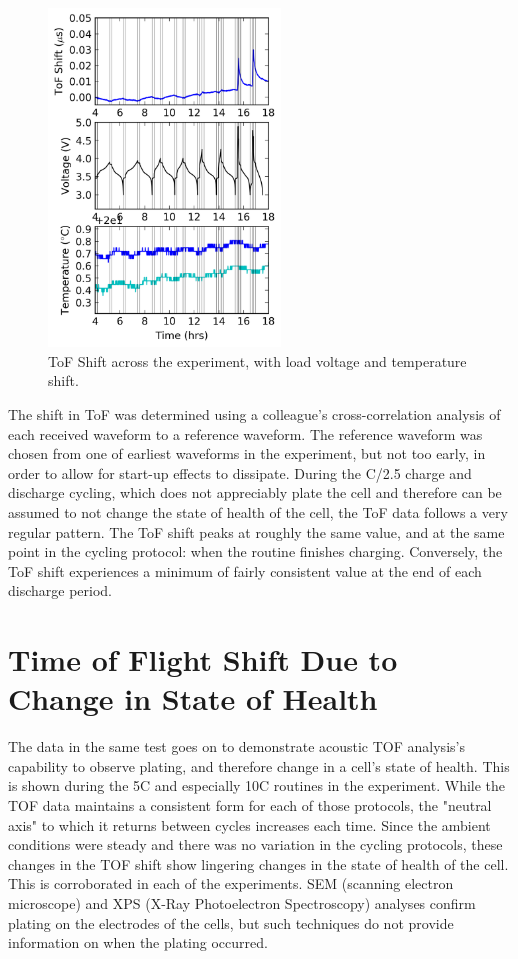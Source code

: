 \begin{figure}[t]\label{fig:0315}
    \includegraphics[width=0.55\textwidth]{Thesis/0315.png}
    \centering
    \caption{ToF Shift across the experiment, with load voltage and temperature shift.}
\end{figure}

The shift in ToF was determined using a colleague's cross-correlation analysis of each received waveform to a reference waveform. The reference waveform was chosen from one of earliest waveforms in the experiment, but not too early, in order to allow for start-up effects to dissipate.
During the C/2.5 charge and discharge cycling, which does not appreciably plate the cell and therefore can be assumed to not change the state of health of the cell, the ToF data follows a very regular pattern. 
The ToF shift peaks at roughly the same value, and at the same point in the cycling protocol: when the routine finishes charging. 
Conversely, the ToF shift experiences a minimum of fairly consistent value at the end of each discharge period.

\section{Time of Flight Shift Due to Change in State of Health}
The data in the same test goes on to demonstrate acoustic TOF analysis's capability to observe plating, and therefore change in a cell's state of health. This is shown during the 5C and especially 10C routines in the experiment. 
While the TOF data maintains a consistent form for each of those protocols, the "neutral axis" to which it returns between cycles increases each time. 
Since the ambient conditions were steady and there was no variation in the cycling protocols, these changes in the TOF shift show lingering changes in the state of health of the cell. 
This is corroborated in each of the experiments. 
SEM (scanning electron microscope) and XPS (X-Ray Photoelectron Spectroscopy) analyses confirm plating on the electrodes of the cells, but such techniques do not provide information on when the plating occurred.

